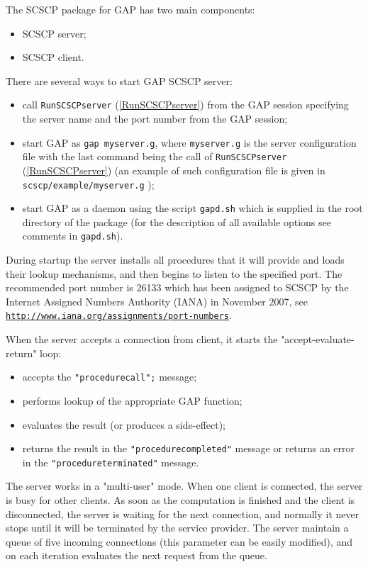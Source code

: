 \documentclass[a4paper,11pt]{report}
\begin{document}
{ The \textsf{SCSCP} package for \textsf{GAP} has two main components: 
\begin{itemize}
\item SCSCP server;
\item SCSCP client.
\end{itemize}
 There are several ways to start \textsf{GAP} \textsf{SCSCP} server: 
\begin{itemize}
\item call \texttt{RunSCSCPserver} (\ref{RunSCSCPserver}) from the \textsf{GAP} session specifying the server name and the port number from the \textsf{GAP} session; 
\item start \textsf{GAP} as \texttt{gap myserver.g}, where \texttt{myserver.g} is the server configuration file with the last command being the call of \texttt{RunSCSCPserver} (\ref{RunSCSCPserver}) (an example of such configuration file is given in \texttt{scscp/example/myserver.g} ); 
\item start \textsf{GAP} as a daemon using the script \texttt{gapd.sh} which is supplied in the root directory of the package (for the description of
all available options see comments in \texttt{gapd.sh}). 
\end{itemize}
 During startup the server installs all procedures that it will provide and
loads their lookup mechanisms, and then begins to listen to the specified
port. The recommended port number is 26133 which has been assigned to SCSCP by
the Internet Assigned Numbers Authority (IANA) in November 2007, see \href{http://www.iana.org/assignments/port-numbers} {\texttt{http://www.iana.org/assignments/port-numbers}}. 

 When the server accepts a connection from client, it starts the
"accept-evaluate-return" loop: 
\begin{itemize}
\item accepts the \texttt{"procedure{\textunderscore}call";} message;
\item performs lookup of the appropriate GAP function;
\item evaluates the result (or produces a side-effect);
\item returns the result in the \texttt{"procedure{\textunderscore}completed"} message or returns an error in the \texttt{"procedure{\textunderscore}terminated"} message.
\end{itemize}
 The server works in a "multi-user" mode. When one client is connected, the
server is busy for other clients. As soon as the computation is finished and
the client is disconnected, the server is waiting for the next connection, and
normally it never stops until it will be terminated by the service provider.
The server maintain a queue of five incoming connections (this parameter can
be easily modified), and on each iteration evaluates the next request from the
queue. 

}
\end{document}
